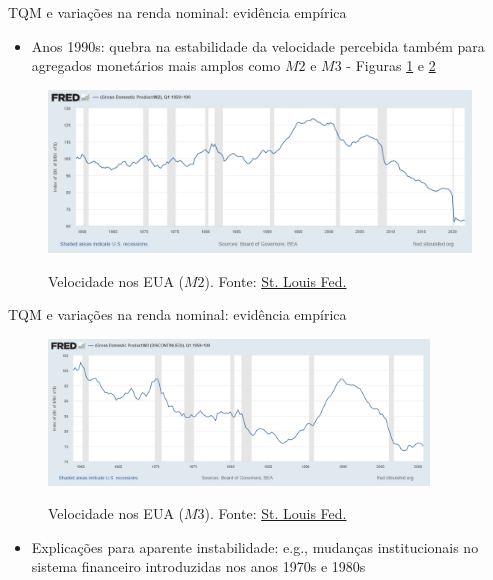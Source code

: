 \documentclass[10pt]{beamer}
\begin{document}
\begin{frame}{TQM e variações na renda nominal: evidência empírica}
    \begin{itemize}
        \item Anos 1990s: quebra na estabilidade da velocidade percebida também para agregados monetários mais amplos como $M2$ e $M3$ - Figuras \ref{fig2} e \ref{fig3}
    \end{itemize}
    \begin{figure}
        \centering
        \href{https://fred.stlouisfed.org/graph/?g=PNQI}{\includegraphics[width=\textwidth]{./figures/aula10_fig2.png}}
        \caption{Velocidade nos EUA ($M2$). Fonte: \href{https://fred.stlouisfed.org/graph/?g=PNQI}{St. Louis Fed.}}
        \label{fig2}
    \end{figure}
\end{frame}

\begin{frame}{TQM e variações na renda nominal: evidência empírica}
    \begin{figure}
        \centering
        \href{https://fred.stlouisfed.org/graph/?g=PNRb}{\includegraphics[width=0.9\textwidth]{./figures/aula10_fig3.png}}
        \caption{Velocidade nos EUA ($M3$). Fonte: \href{https://fred.stlouisfed.org/graph/?g=PNRb}{St. Louis Fed.}}
        \label{fig3}
    \end{figure}
    \begin{itemize}
        \item Explicações para aparente instabilidade: e.g., mudanças institucionais no sistema financeiro introduzidas nos anos 1970s e 1980s
    \end{itemize}
\end{frame}
\end{document}
